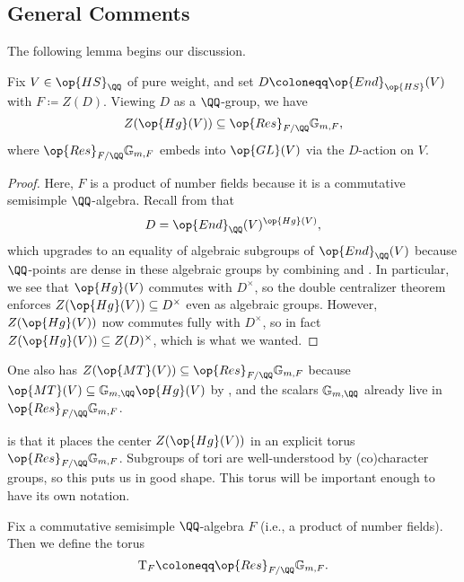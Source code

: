 \documentclass[../thesis.tex]{subfiles}
\begin{document}
\subsection{General Comments}
The following lemma begins our discussion.
\begin{lemma} \label{lem:hg-center-in-torus}
	Fix $V\in\op{HS}_\QQ$ of pure weight, and set $D\coloneqq\op{End}_{\op{HS}}(V)$ with $F\coloneqq Z(D)$. Viewing $D$ as a $\QQ$-group, we have
	\[Z(\op{Hg}(V))\subseteq\op{Res}_{F/\QQ}\mathbb G_{m,F},\]
	where $\op{Res}_{F/\QQ}\mathbb G_{m,F}$ embeds into $\op{GL}(V)$ via the $D$-action on $V$.
\end{lemma}
\begin{proof}
	Here, $F$ is a product of number fields because it is a commutative semisimple $\QQ$-algebra. Recall from  that
	\[D=\op{End}_\QQ(V)^{\op{Hg}(V)},\]
	which upgrades to an equality of algebraic subgroups of $\op{End}_\QQ(V)$ because $\QQ$-points are dense in these algebraic groups by combining \cite[Corollary~17.92]{milne-alg-groups} and \cite[Definition~12.59]{milne-alg-groups}. In particular, we see that $\op{Hg}(V)$ commutes with $D^\times$, so the double centralizer theorem enforces $Z(\op{Hg}(V))\subseteq D^\times$ even as algebraic groups. However, $Z(\op{Hg}(V))$ now commutes fully with $D^\times$, so in fact $Z(\op{Hg}(V))\subseteq Z(D)^\times$, which is what we wanted.
\end{proof}
\begin{remark} \label{rem:mt-center-in-torus}
	One also has $Z(\op{MT}(V))\subseteq\op{Res}_{F/\QQ}\mathbb G_{m,F}$ because $\op{MT}(V)\subseteq\mathbb G_{m,\QQ}\op{Hg}(V)$ by , and the scalars $\mathbb G_{m,\QQ}$ already live in $\op{Res}_{F/\QQ}\mathbb G_{m,F}$.
\end{remark}
 is that it places the center $Z(\op{Hg}(V))$ in an explicit torus $\op{Res}_{F/\QQ}\mathbb G_{m,F}$. Subgroups of tori are well-understood by (co)character groups, so this puts us in good shape. This torus will be important enough to have its own notation.
\begin{notation}
	Fix a commutative semisimple $\QQ$-algebra $F$ (i.e., a product of number fields). Then we define the torus
	\[\mathrm T_F\coloneqq\op{Res}_{F/\QQ}\mathbb G_{m,F}.\]
\end{notation}
\end{document}
